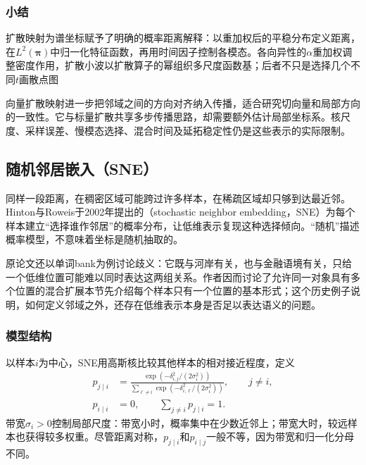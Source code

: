 \subsubsection{小结}

扩散映射为谱坐标赋予了明确的概率距离解释：以重加权后的平稳分布定义距离，在$L^2(\bm{\pi})$中归一化特征函数，再用时间因子控制各模态。各向异性的$\alpha$重加权调整密度作用，扩散小波以扩散算子的幂组织多尺度函数基；后者不只是选择几个不同$t$画散点图

向量扩散映射进一步把邻域之间的方向对齐纳入传播，适合研究切向量和局部方向的一致性。它与标量扩散共享多步传播思路，却需要额外估计局部坐标系。核尺度、采样误差、慢模态选择、混合时间及延拓稳定性仍是这些表示的实际限制。

\subsection{随机邻居嵌入（SNE）}
\label{sec:dim-sne}

同样一段距离，在稠密区域可能跨过许多样本，在稀疏区域却只够到达最近邻。Hinton与Roweis于2002年提出的（stochastic neighbor embedding，SNE）为每个样本建立“选择谁作邻居”的概率分布，让低维表示复现这种选择倾向。“随机”描述概率模型，不意味着坐标是随机抽取的。

原论文还以单词bank为例讨论歧义：它既与河岸有关，也与金融语境有关，只给一个低维位置可能难以同时表达这两组关系。作者因而讨论了允许同一对象具有多个位置的混合扩展本节先介绍每个样本只有一个位置的基本形式；这个历史例子说明，如何定义邻域之外，还存在低维表示本身是否足以表达语义的问题。

\subsubsection{模型结构}

以样本$i$为中心，SNE用高斯核比较其他样本的相对接近程度，定义
\begin{equation}
  \label{eq:dim-sne-high}
  \begin{aligned}
    p_{j\mid i}
      &=\frac{\exp(-\delta_{i,j}^2/(2\sigma_i^2))}
      {\sum_{\ell\ne i}\exp(-\delta_{i,\ell}^2/(2\sigma_i^2))},
      \qquad j\ne i,\\
    p_{i\mid i}&=0,\qquad \sum_{j\ne i}p_{j\mid i}=1.
  \end{aligned}
\end{equation}
带宽$\sigma_i>0$控制局部尺度：带宽小时，概率集中在少数近邻上；带宽大时，较远样本也获得较多权重。尽管距离对称，$p_{j\mid i}$和$p_{i\mid j}$一般不等，因为带宽和归一化分母不同。

